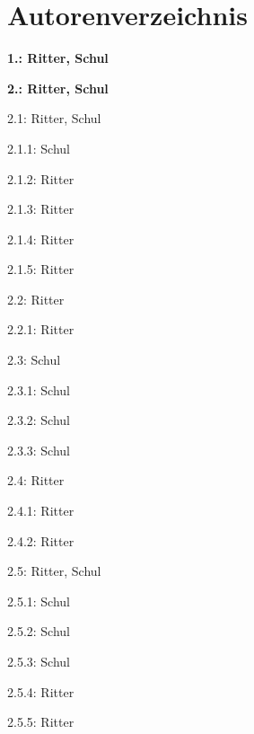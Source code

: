\documentclass[12pt]{report}
\begin{document}
\section{Autorenverzeichnis}
\begin{multicols}{2}
\begin{compactitem}
\item[] \textbf{1.: Ritter, Schul}
\item[] \textbf{2.: Ritter, Schul}

\begin{compactitem}
\item[] 2.1: Ritter, Schul
\begin{compactitem}
\item[] 2.1.1: Schul
\item[] 2.1.2: Ritter
\item[] 2.1.3: Ritter
\item[] 2.1.4: Ritter
\item[] 2.1.5: Ritter
\end{compactitem}

\item[] 2.2: Ritter
\begin{compactitem}
\item[] 2.2.1: Ritter
\end{compactitem}

\item[] 2.3: Schul
\begin{compactitem}
\item[] 2.3.1: Schul
\item[] 2.3.2: Schul
\item[] 2.3.3: Schul
\end{compactitem}
\item[] 2.4: Ritter
\begin{compactitem}
\item[] 2.4.1: Ritter
\item[] 2.4.2: Ritter
\end{compactitem}

\item[] 2.5: Ritter, Schul
\begin{compactitem}
\item[] 2.5.1: Schul
\item[] 2.5.2: Schul
\item[] 2.5.3: Schul
\item[] 2.5.4: Ritter
\item[] 2.5.5: Ritter
\end{compactitem}


\end{compactitem}
\end{compactitem}
\end{multicols}
\end{document}
